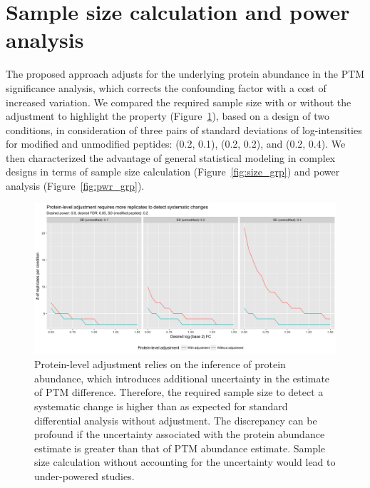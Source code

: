 \documentclass{mcp}
\def\sfigref#1{{Figure~\ref{#1}}}
\begin{document}
\clearpage
\section{Sample size calculation and power analysis}

The proposed approach adjusts for the underlying protein abundance in the PTM significance analysis, which corrects the confounding factor with a cost of increased variation. We compared the required sample size with or without the adjustment to highlight the property (\sfigref{fig:size_prot}), based on a design of two conditions, in consideration of three pairs of standard deviations of log-intensities for modified and unmodified peptides: (0.2, 0.1), (0.2, 0.2), and (0.2, 0.4). 
We then characterized the advantage of general statistical modeling in complex designs in terms of sample size calculation (\sfigref{fig:size_grp}) and power analysis (\sfigref{fig:pwr_grp}). 

\begin{figure}[h!]
\centering
\includegraphics[width=\textwidth]{sim/size_prot}
\caption{Protein-level adjustment relies on the inference of protein abundance, which introduces additional uncertainty in the estimate of PTM difference. Therefore, the required sample size to detect a systematic change is higher than as expected for standard differential analysis without adjustment. The discrepancy can be profound if the uncertainty associated with the protein abundance estimate is greater than that of PTM abundance estimate. Sample size calculation without accounting for the uncertainty would lead to under-powered studies. \label{fig:size_prot}}
\end{figure}
\end{document}
